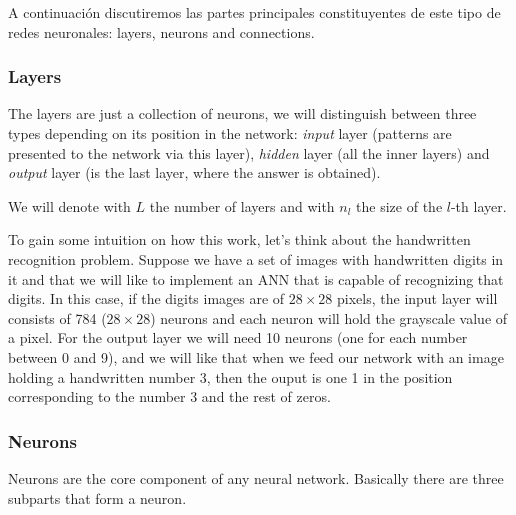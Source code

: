 A continuación discutiremos las partes principales constituyentes de este tipo
de redes neuronales: layers, neurons and connections.

\subsubsection{Layers}
The layers are just a collection of neurons, we will distinguish between three
types depending on its position in the network: \emph{input} layer (patterns
are presented to the network via this layer), \emph{hidden} layer (all the
inner layers) and \emph{output} layer (is the last layer, where the answer is
obtained).

We will denote with \(L\) the number of layers and with \(n_l\) the size of the
\(l\)-th layer.

To gain some intuition on how this work, let's think about the handwritten
recognition problem. Suppose we have a set of images with handwritten digits in
it and that we will like to implement an ANN that is capable of recognizing
that digits. In this case, if the digits images are of \(28 \times 28\) pixels,
the input layer will consists of 784 (\(28 \times 28\)) neurons and each neuron
will hold the grayscale value of a pixel. For the output layer we will need 10
neurons (one for each number between 0 and 9), and we will like that when we
feed our network with an image holding a handwritten number 3, then the ouput
is one 1 in the position corresponding to the number 3 and the rest of zeros.

\subsubsection{Neurons}
Neurons are the core component of any neural network. Basically there are three
subparts that form a neuron.

